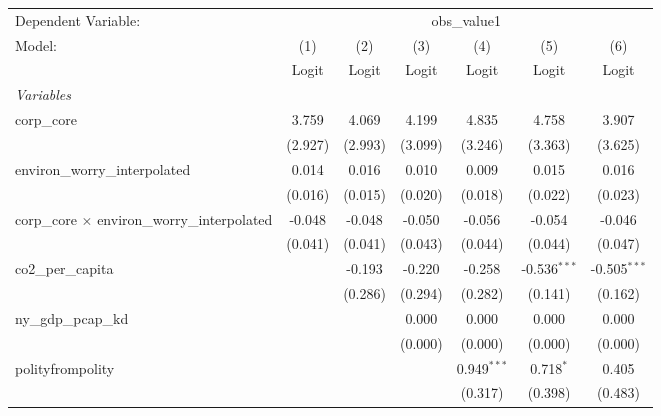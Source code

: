 
\begingroup
\centering
\begin{tabular}{lcccccc}
   \toprule
   Dependent Variable: & \multicolumn{6}{c}{obs\_value1}\\
   Model:                                               & (1)     & (2)     & (3)     & (4)           & (5)            & (6)\\  
                                                        &  Logit  & Logit   & Logit   & Logit         & Logit          & Logit\\  
   \midrule
   \emph{Variables}\\
   corp\_core                                           & 3.759   & 4.069   & 4.199   & 4.835         & 4.758          & 3.907\\   
                                                        & (2.927) & (2.993) & (3.099) & (3.246)       & (3.363)        & (3.625)\\   
   environ\_worry\_interpolated                         & 0.014   & 0.016   & 0.010   & 0.009         & 0.015          & 0.016\\   
                                                        & (0.016) & (0.015) & (0.020) & (0.018)       & (0.022)        & (0.023)\\   
   corp\_core $\times$ environ\_worry\_interpolated     & -0.048  & -0.048  & -0.050  & -0.056        & -0.054         & -0.046\\   
                                                        & (0.041) & (0.041) & (0.043) & (0.044)       & (0.044)        & (0.047)\\   
   co2\_per\_capita                                     &         & -0.193  & -0.220  & -0.258        & -0.536$^{***}$ & -0.505$^{***}$\\   
                                                        &         & (0.286) & (0.294) & (0.282)       & (0.141)        & (0.162)\\   
   ny\_gdp\_pcap\_kd                                    &         &         & 0.000   & 0.000         & 0.000          & 0.000\\   
                                                        &         &         & (0.000) & (0.000)       & (0.000)        & (0.000)\\   
   polityfrompolity                                     &         &         &         & 0.949$^{***}$ & 0.718$^{*}$    & 0.405\\   
                                                        &         &         &         & (0.317)       & (0.398)        & (0.483)\\   

\end{tabular}
